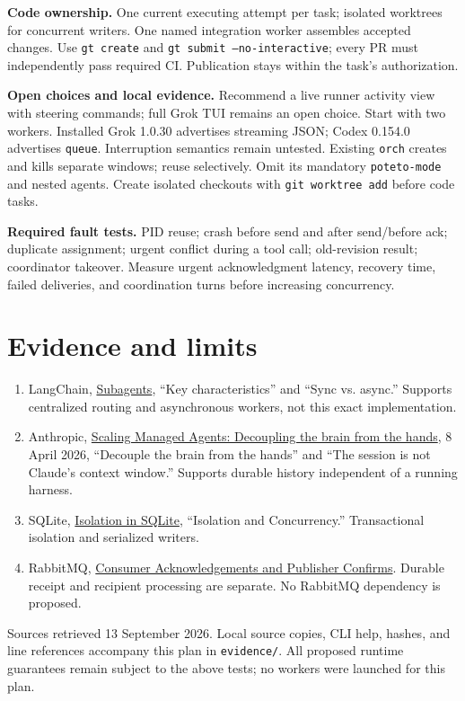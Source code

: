\documentclass[11pt,letterpaper]{article}
\begin{document}
\textbf{Code ownership.} One current executing attempt per task; isolated worktrees
for concurrent writers. One named integration worker assembles accepted changes.
Use \texttt{gt create} and \texttt{gt submit --no-interactive}; every PR must
independently pass required CI. Publication stays within the task's authorization.

\textbf{Open choices and local evidence.} Recommend a live runner activity view
with steering commands; full Grok TUI remains an open choice. Start with two workers.
Installed Grok 1.0.30 advertises streaming JSON; Codex 0.154.0 advertises
\texttt{queue}. Interruption semantics remain untested. Existing \texttt{orch}
creates and kills separate windows; reuse selectively. Omit its mandatory
\texttt{poteto-mode} and nested agents. Create isolated checkouts with
\texttt{git worktree add} before code tasks.

\textbf{Required fault tests.} PID reuse; crash before send and after send/before ack;
duplicate assignment; urgent conflict during a tool call; old-revision result;
coordinator takeover. Measure urgent acknowledgment latency, recovery time, failed
deliveries, and coordination turns before increasing concurrency.

\section*{Evidence and limits}
{\small
\begin{enumerate}[leftmargin=1.5em]
\item\label{s1} LangChain, \href{https://docs.langchain.com/oss/python/langchain/multi-agent/subagents}{Subagents}, ``Key characteristics'' and ``Sync vs. async.'' Supports centralized routing and asynchronous workers, not this exact implementation.
\item\label{s2} Anthropic, \href{https://www.anthropic.com/engineering/managed-agents}{Scaling Managed Agents: Decoupling the brain from the hands}, 8 April 2026, ``Decouple the brain from the hands'' and ``The session is not Claude's context window.'' Supports durable history independent of a running harness.
\item\label{s3} SQLite, \href{https://www.sqlite.org/isolation.html}{Isolation in SQLite}, ``Isolation and Concurrency.'' Transactional isolation and serialized writers.
\item\label{s4} RabbitMQ, \href{https://www.rabbitmq.com/docs/confirms}{Consumer Acknowledgements and Publisher Confirms}. Durable receipt and recipient processing are separate. No RabbitMQ dependency is proposed.
\end{enumerate}
Sources retrieved 13 September 2026. Local source copies, CLI help, hashes, and
line references accompany this plan in \texttt{evidence/}. All proposed runtime
guarantees remain subject to the above tests; no workers were launched for this plan.
}
\end{document}
